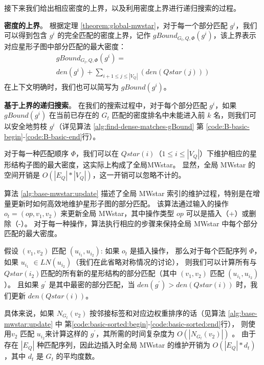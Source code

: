 接下来我们给出相应密度的上界，以及利用密度上界进行递归搜索的过程。



\textbf{密度的上界}。 根据定理 \ref{theorem:global-mwstar}，对于每一个部分匹配 $g^i$，我们可以得到包含 $g^i$ 的完全匹配的密度上界，记作 $gBound_{G_t, Q, \Phi}(g^i)$，该上界表示对应星形子图中部分匹配的最大密度：
  \begin{equation*}
	\begin{multlined}
	 gBound_{G_t, Q, \Phi}(g^i) =  \\ den(g^i) + \sum\nolimits_{i+1\leq j\leq |V_Q|} \left(den(Qstar(j))\right)
	\end{multlined}
  \end{equation*}
  在上下文明确时，我们也可以简写为 $gBound(g^i)$。
  
  \textbf{基于上界的递归搜索}。 在我们的搜索过程中，对于每个部分匹配 $g^i$，如果 $gBound(g^i)$ 在当前已存在的 $G_t$ 匹配的密度排名中未能进入前 $k$ 名，则我们可以安全地剪枝 $g^i$（详见算法 \ref{alg:find-dense-matches-gBound}  第 \ref{code:B-basic-begin}-\ref{code:B-basic-end}行）。
  
  对于每一种匹配顺序 $\Phi$，我们可以在 $Qstar(i)$（$1 \leq i \leq |V_Q|$）下维护相应的星形结构子图的最大密度，这实际上构成了全局MWstar。
  显然，全局 MWstar 的空间开销是 $O(|E_Q|*|V_Q|)$，这一开销可以忽略不计的。

    算法 \ref{alg:base-mwstar:update} 描述了全局 MWstar 索引的维护过程，特别是在增量更新时如何高效地维护星形子图的部分匹配。
    该算法通过输入的操作 $o_t = (op, v_1, v_2)$ 来更新全局 MWstar，其中操作类型 $op$ 可以是插入（+）或删除（-）。
    对于每一种操作，算法执行相应的步骤来保持全局 MWstar 中每个部分匹配的最大密度。
    
    假设 $(v_1, v_2)$ 匹配 $(u_{i_1}, u_{i_2})$: 
     如果 $o_t$ 是插入操作，
     那么对于每个匹配序列 $\Phi$，如果 $u_{i_1}$ $\in LN(u_{i_2})$（我们在此省略对称情况的讨论），
     则我们可以计算所有与 $Qstar(i_2)$匹配的所有新的星形结构的部分匹配（其中 $(v_1, v_2)$ 匹配 $(u_{i_1}, u_{i_2})$）。
     且如果 $g^\prime$ 是其中最密的部分匹配，当 $den(g^\prime) > den(Qstar(i))$ 时，我们更新 $den(Qstar(i))$。
     
     具体来说，如果 $N_{G_t}(v_2)$ 按邻接标签和对应边权重排序的话（见算法 \ref{alg:base-mwstar:update} 中 第\ref{code:basic-sorted:begin}-\ref{code:basic-sorted:end}行），
     则使用$v_2$ 匹配 $u_{i_2}$来计算这样的 $g^\prime$，其所需的时间复杂度为 $O(|N_{G_t}(v_2)|)$ 。
     由于存在 $|E_Q|$ 种匹配序列，因此边插入时全局 MWstar 的维护开销为 $O(|E_Q|*d_t)$，其中 $d_t$ 是 $G_t$ 的平均度数。
     
